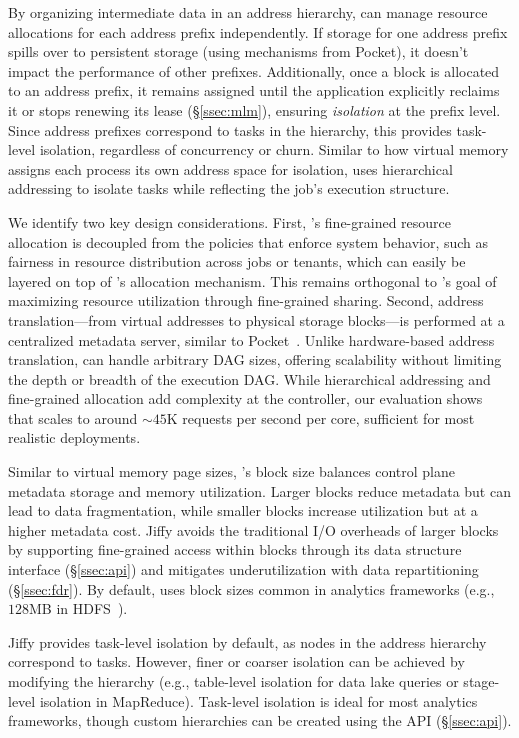 By organizing intermediate data in an address hierarchy, \jiffy can manage resource allocations for each address prefix independently. If storage for one address prefix spills over to persistent storage (using mechanisms from Pocket), it doesn't impact the performance of other prefixes. Additionally, once a block is allocated to an address prefix, it remains assigned until the application explicitly reclaims it or stops renewing its lease (\S\ref{ssec:mlm}), ensuring \textit{isolation} at the prefix level. Since address prefixes correspond to tasks in the hierarchy, this provides task-level isolation, regardless of concurrency or churn. Similar to how virtual memory assigns each process its own address space for isolation, \jiffy uses hierarchical addressing to isolate tasks while reflecting the job's execution structure.

We identify two key design considerations. First, \jiffy's fine-grained resource allocation is decoupled from the policies that enforce system behavior, such as fairness in resource distribution across jobs or tenants, which can easily be layered on top of \jiffy's allocation mechanism. This remains orthogonal to \jiffy's goal of maximizing resource utilization through fine-grained sharing. Second, address translation—from virtual addresses to physical storage blocks—is performed at a centralized metadata server, similar to Pocket~\cite{pocket}. Unlike hardware-based address translation, \jiffy can handle arbitrary DAG sizes, offering scalability without limiting the depth or breadth of the execution DAG. While hierarchical addressing and fine-grained allocation add complexity at the controller, our evaluation shows that \jiffy scales to around ${\sim}45$K requests per second per core, sufficient for most realistic deployments.

 Similar to virtual memory page sizes, \jiffy's block size balances control plane metadata storage and memory utilization. Larger blocks reduce metadata but can lead to data fragmentation, while smaller blocks increase utilization but at a higher metadata cost. Jiffy avoids the traditional I/O overheads of larger blocks by supporting fine-grained access within blocks through its data structure interface (\S\ref{ssec:api}) and mitigates underutilization with data repartitioning (\S\ref{ssec:fdr}). By default, \jiffy uses block sizes common in analytics frameworks (e.g., $128$MB in HDFS~\cite{hdfs}).

 Jiffy provides task-level isolation by default, as nodes in the address hierarchy correspond to tasks. However, finer or coarser isolation can be achieved by modifying the hierarchy (e.g., table-level isolation for data lake queries or stage-level isolation in MapReduce). Task-level isolation is ideal for most analytics frameworks, though custom hierarchies can be created using the \jiffy API (\S\ref{ssec:api}).

